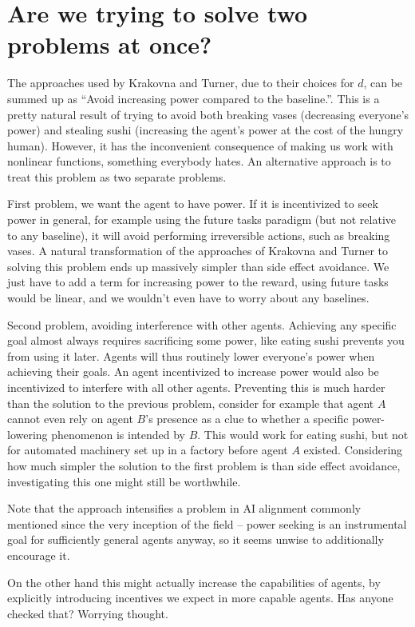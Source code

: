 \documentclass{article}
\newcommand{\deviationFromBaseline}{d}
\begin{document}
\section{Are we trying to solve two problems at once?}
	The approaches used by Krakovna and Turner, due to their choices for $\deviationFromBaseline$,
	can be summed up as ``Avoid increasing power compared to the baseline.''. This is a pretty natural
	result of trying to avoid both breaking vases (decreasing everyone's power) and stealing sushi
	(increasing the agent's power at the cost of the hungry human). However, it has the inconvenient
	consequence of making us work with nonlinear functions, something everybody hates.
	An alternative approach is to treat this problem as two separate problems.

	First problem, we want the agent to have power. If it is incentivized to seek power in general,
	for example using the future tasks paradigm (but not relative to any baseline), it will avoid
	performing irreversible actions, such as breaking vases. A natural transformation of the approaches
	of Krakovna and Turner to solving this problem ends up massively simpler than side effect avoidance.
	We just have to add a term for increasing power to the reward, using future tasks would be linear,
	and we wouldn't even have to worry about any baselines.

	Second problem, avoiding interference with other agents. Achieving any specific goal almost always
	requires sacrificing some power, like eating sushi prevents you from using it later. Agents will
	thus routinely lower everyone's power when achieving their goals. An agent incentivized to increase
	power would also be incentivized to interfere with all other agents. Preventing this is much harder
	than the solution to the previous problem, consider for example that agent $A$ cannot even rely
	on agent $B$'s presence as a clue to whether a specific power-lowering phenomenon is intended by $B$.
	This would work for eating sushi, but not for automated machinery set up in a factory before agent $A$
	existed. Considering how much simpler the solution to the first problem is than side effect avoidance,
	investigating this one might still be worthwhile.

	Note that the approach intensifies a problem in AI alignment commonly mentioned since the very
	inception of the field -- power seeking is an instrumental goal for sufficiently general
	agents anyway, so it seems unwise to additionally encourage it.

	On the other hand this might actually increase the capabilities of agents, by explicitly introducing
	incentives we expect in more capable agents.
	Has anyone checked that? Worrying thought.
\appendix
\end{document}
